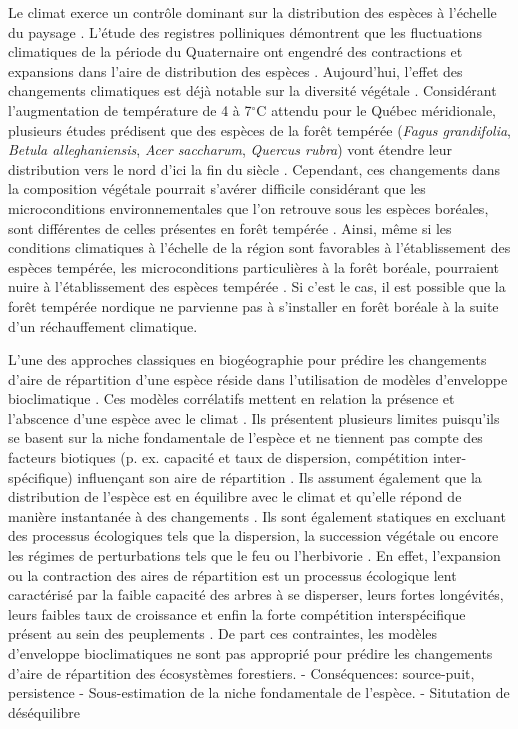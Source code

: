 Le climat exerce un contrôle dominant sur la distribution des espèces à l'échelle du paysage
\citep{Pearson2003b}. L'étude des registres polliniques démontrent que les fluctuations climatiques
de la période du Quaternaire ont engendré des contractions et expansions dans l'aire de distribution
des espèces \citep{Davis2001}. Aujourd'hui, l'effet des changements climatiques est déjà notable sur
la diversité végétale \citep{Walther2002a,Parmesan2006}. Considérant l'augmentation de température
de 4 à 7$^\circ$C \citep[Scénario RCP 8.5]{Climatique2015} attendu pour le Québec méridionale,
plusieurs études prédisent que des espèces de la forêt tempérée (\textit{Fagus grandifolia},
\textit{Betula alleghaniensis}, \textit{Acer saccharum}, \textit{Quercus rubra}) vont étendre leur
distribution vers le nord d'ici la fin du siècle \citep{Iverson2002,Sciences2014}. Cependant, ces
changements dans la composition végétale pourrait s'avérer difficile considérant que les
microconditions environnementales que l’on retrouve sous les espèces boréales, sont différentes de
celles présentes en forêt tempérée \citep{Barras1998,Caspersen2005}. Ainsi, même si les conditions
climatiques à l'échelle de la région sont favorables à l'établissement des espèces tempérée, les
microconditions particulières à la forêt boréale, pourraient nuire à l'établissement des espèces
tempérée \citep{DeFrenne2013,Lafleur2010}. Si c’est le cas, il est possible que la forêt tempérée
nordique ne parvienne pas à s'installer en forêt boréale à la suite d’un réchauffement climatique.

L'une des approches classiques en biogéographie pour prédire les changements d'aire de répartition
d'une espèce réside dans l'utilisation de modèles d'enveloppe bioclimatique \citep{Pearson2003b}.
Ces modèles corrélatifs mettent en relation la présence et l'abscence d'une espèce avec le climat
\citep{Guisan2005a}. Ils présentent plusieurs limites puisqu'ils se basent sur la niche fondamentale
de l'espèce et ne tiennent pas compte des facteurs biotiques (p. ex. capacité et taux de dispersion,
compétition inter-spécifique) influençant son aire de répartition \citep{Guisan2005a,Pearson2003b}.
Ils assument également que la distribution de l'espèce est en équilibre avec le climat et qu'elle
répond de manière instantanée à des changements \citep{Austin2002}. Ils sont également statiques en
excluant des processus écologiques tels que la dispersion, la succession végétale ou encore les
régimes de perturbations tels que le feu ou l'herbivorie \citep{Austin2002,Guisan2005a}. En effet,
l'expansion ou la contraction des aires de répartition est un processus écologique lent caractérisé
par la faible capacité des arbres à se disperser, leurs fortes longévités, leurs faibles taux de
croissance et enfin la forte compétition interspécifique présent au sein des peuplements
\citep{Renwick2014,Vanderwel2014}. De part ces contraintes, les modèles d'enveloppe bioclimatiques
ne sont pas approprié pour prédire les changements d'aire de répartition des écosystèmes forestiers. 
- Conséquences: source-puit, persistence
- Sous-estimation de la niche fondamentale de l'espèce.
- Situtation de déséquilibre  

